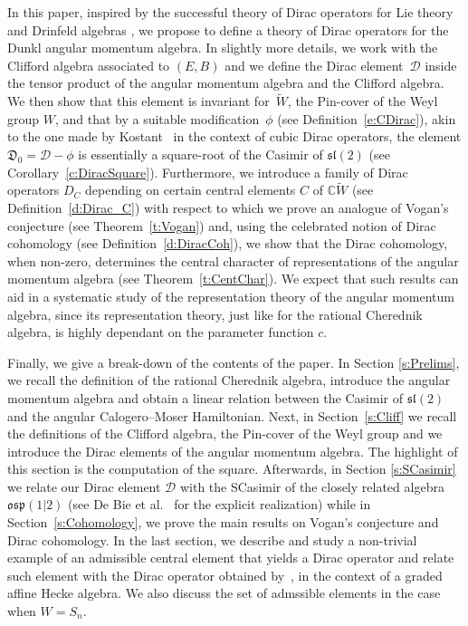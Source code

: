 \documentclass[10pt,a4paper]{amsart}
\numberwithin{equation}{section}
\newcommand{\bbc}{\mathbb{C}}
\begin{document}
In this paper, inspired by the successful theory of Dirac operators for Lie theory \cite{AS77,HP02,K03,P72,V97}
and Drinfeld algebras \cite{BCT12,C20,C16,CDM18, COT14}, we propose to define a theory of Dirac operators for the Dunkl angular momentum algebra. In slightly more details, we work with the Clifford algebra associated to $(E,B)$ and we define the Dirac element~$\mathcal{D}$ inside the tensor product of the angular momentum algebra and the Clifford algebra. We then show that this element is invariant for~$\tilde{W}$, the Pin-cover of the Weyl group $W$, and that by a suitable modification~$\phi$ (see Definition~\ref{e:CDirac}), akin to the one made by Kostant~\cite{K03} in the context of cubic Dirac operators, the element $\mathfrak{D}_0 = \mathcal{D} - \phi$ is essentially a square-root of the Casimir of $\mathfrak{sl}(2)$ (see Corollary~\ref{c:DiracSquare}). Furthermore, we introduce a family of Dirac operators $D_C$ depending on certain central elements $C$ of $\bbc \tilde W$ (see Definition~\ref{d:Dirac_C}) with respect to which we prove an analogue of Vogan's conjecture (see Theorem~\ref{t:Vogan}) and, using the celebrated notion of Dirac cohomology (see Definition~\ref{d:DiracCoh}), we show that the Dirac cohomology, when non-zero, determines the central character of representations of the angular momentum algebra (see Theorem~\ref{t:CentChar}). We expect that such results can aid in a systematic study of the representation theory of the angular momentum algebra, since its representation theory, just like for the rational Cherednik algebra, is highly dependant on the parameter function $c$.

Finally, we give a break-down of the contents of the paper. In Section \ref{s:Prelims}, we recall the definition of the rational Cherednik algebra, introduce the angular momentum algebra and obtain a linear relation between the Casimir of $\mathfrak{sl}(2)$ and the angular Calogero--Moser Hamiltonian. Next, in Section~\ref{s:Cliff} we recall the definitions of the Clifford algebra, the Pin-cover of the Weyl group and we introduce the Dirac elements of the angular momentum algebra. The highlight of this section is the computation of the square. Afterwards, in Section \ref{s:SCasimir} we relate our Dirac element $\mathcal{D}$ with the SCasimir of the closely related algebra $\mathfrak{osp}(1|2)$ (see De Bie et al.~\cite{DOV18a,DOV18b} for the explicit realization) while in Section~\ref{s:Cohomology}, we prove the main results on Vogan's conjecture and Dirac cohomology. In the last section, we describe and study a non-trivial example of an admissible central element that yields a Dirac operator and relate such element with the Dirac operator obtained by~\cite{BCT12}, in the context of a graded affine Hecke algebra. We also discuss the set of admssible elements in the case when $W=S_n$.
\end{document}
